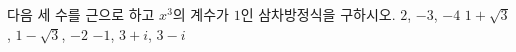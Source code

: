 다음 세 수를 근으로 하고 $x^3$의 계수가 $1$인 삼차방정식을 구하시오.
 $2$, $-3$, $-4$
 $1+\sqrt{3}$, $1-\sqrt{3}$, $-2$
 $-1$, $3+i$, $3-i$ 
